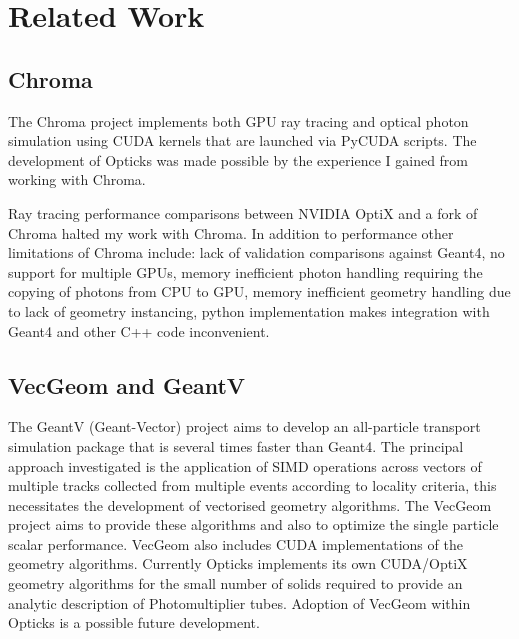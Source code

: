 \documentclass[a4paper]{jpconf}
\begin{document}
\section{Related Work}

\subsection{Chroma}

The Chroma project\cite{chromaURL}\cite{chromaB}  
implements both GPU ray tracing and optical photon simulation using CUDA kernels
that are launched via PyCUDA scripts. 
The development of Opticks was made possible by  
the experience I gained from working with Chroma.

Ray tracing performance comparisons between NVIDIA OptiX and a 
fork of Chroma\cite{chromaFork} halted my work with Chroma.
In addition to performance other limitations of Chroma include:
lack of validation comparisons against Geant4, no support for multiple GPUs, 
memory inefficient photon handling requiring the copying of photons from CPU to GPU,
memory inefficient geometry handling due to lack of geometry instancing, python 
implementation makes integration with Geant4 and other C++ code inconvenient. 

\subsection{VecGeom and GeantV}

The GeantV\cite{GeantV} (Geant-Vector) project aims 
to develop an all-particle transport simulation package that is 
several times faster than Geant4. The principal approach investigated 
is the application of SIMD operations across vectors of multiple tracks 
collected from multiple events according to locality criteria, this necessitates 
the development of vectorised geometry algorithms.  
The VecGeom\cite{VecGeom} project aims to provide these algorithms and also 
to optimize the single particle scalar performance.
VecGeom also includes CUDA implementations of the geometry algorithms.
%
Currently Opticks implements its own CUDA/OptiX geometry algorithms
for the small number of solids required to provide an analytic description 
of Photomultiplier tubes. 
Adoption of VecGeom within Opticks is a possible future development.
\end{document}
